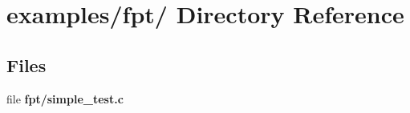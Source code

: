 \hypertarget{dir_000030}{
\section{examples/fpt/ Directory Reference}
\label{dir_000030}
}
\subsection*{Files}
\begin{CompactItemize}
\item 
file {\bf fpt/simple\_\-test.c}
\end{CompactItemize}
